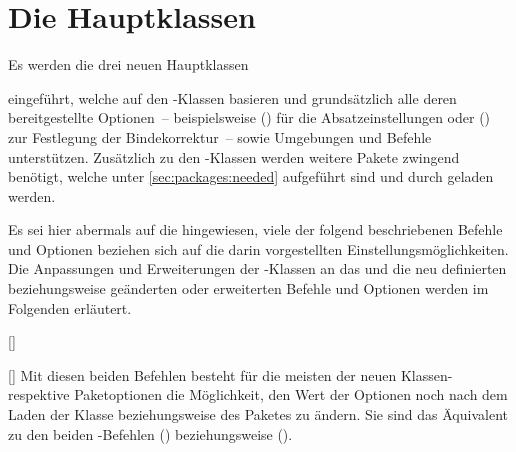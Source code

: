 \chapter[%
  Die Hauptklassen \Class*{tudscrbook}, \Class*{tudscrreprt} und 
  \Class*{tudscrartcl}%
]{Die Hauptklassen}
%
%
%
\begin{Declaration*}{}
\begin{Declaration*}{}
\begin{Declaration*}{}
Es werden die drei neuen Hauptklassen
%
\begin{description}
\item {}
\item {}
\item {}
\end{description}
%
eingeführt, welche auf den \KOMAScript-Klassen basieren und grundsätzlich alle 
deren bereitgestellte Optionen~-- beispielsweise 
() für die Absatzeinstellungen oder 
() zur Festlegung der 
Bindekorrektur~-- sowie Umgebungen und Befehle unterstützen. Zusätzlich zu den 
\KOMAScript-Klassen werden weitere Pakete zwingend benötigt, welche unter 
\autoref{sec:packages:needed} aufgeführt sind und durch \TUDScript geladen 
werden.

Es sei hier abermals auf die  
hingewiesen, viele der folgend beschriebenen Befehle und Optionen beziehen sich 
auf die darin vorgestellten Einstellungsmöglichkeiten. Die Anpassungen und 
Erweiterungen der \KOMAScript-Klassen an das \CD und die neu definierten 
beziehungsweise geänderten oder erweiterten Befehle und Optionen werden im 
Folgenden erläutert.

\begin{Declaration}{[]}
\begin{Declaration}{[]}
\printdeclarationlist%
%
%
Mit diesen beiden Befehlen besteht für die meisten der neuen Klassen- respektive
Paketoptionen die Möglichkeit, den Wert der Optionen noch nach dem Laden der 
Klasse beziehungsweise des Paketes zu ändern. Sie sind das Äquivalent zu den 
beiden \KOMAScript-Befehlen () 
beziehungsweise ().


\end{Declaration}
\end{Declaration}
\end{Declaration*}
\end{Declaration*}
\end{Declaration*}
